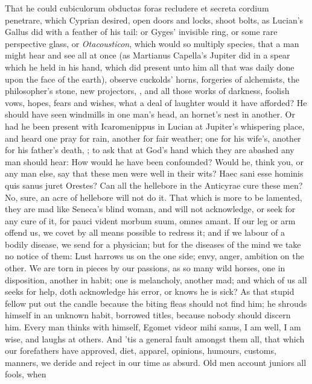 {That he could cubiculorum obductas foras recludere et secreta cordium
penetrare, which Cyprian desired, open doors and locks, shoot
bolts, as Lucian's Gallus did with a feather of his tail: or Gyges'
invisible ring, or some rare perspective glass, or \emph{Otacousticon},
which would so multiply species, that a man might hear and see all at
once (as  Martianus Capella's Jupiter did in a spear which he held
in his hand, which did present unto him all that was daily done upon
the face of the earth), observe cuckolds' horns, forgeries of
alchemists, the philosopher's stone, new projectors, \etc{}, and all those
works of darkness, foolish vows, hopes, fears and wishes, what a deal
of laughter would it have afforded? He should have seen windmills in
one man's head, an hornet's nest in another. Or had he been present
with Icaromenippus in Lucian at Jupiter's whispering place, and
heard one pray for rain, another for fair weather; one for his wife's,
another for his father's death, \etc{}; to ask that at God's hand which
they are abashed any man should hear: How would he have been
confounded? Would he, think you, or any man else, say that these men
were well in their wits? Haec sani esse hominis quis sanus juret
Orestes? Can all the hellebore in the Anticyrae cure these men? No,
sure, an acre of hellebore will not do it.
That which is more to be lamented, they are mad like Seneca's blind
woman, and will not acknowledge, or seek for any cure of it, for
pauci vident morbum suum, omnes amant. If our leg or arm offend us, we
covet by all means possible to redress it; and if we labour of a
bodily disease, we send for a physician; but for the diseases of the
mind we take no notice of them: Lust harrows us on the one side;
envy, anger, ambition on the other. We are torn in pieces by our
passions, as so many wild horses, one in disposition, another in habit;
one is melancholy, another mad; and which of us all seeks for
help, doth acknowledge his error, or knows he is sick? As that stupid
fellow put out the candle because the biting fleas should not find him;
he shrouds himself in an unknown habit, borrowed titles, because nobody
should discern him. Every man thinks with himself, Egomet videor mihi
sanus, I am well, I am wise, and laughs at others. And 'tis a general
fault amongst them all, that  which our forefathers have approved,
diet, apparel, opinions, humours, customs, manners, we deride and
reject in our time as absurd. Old men account juniors all fools, when
}
